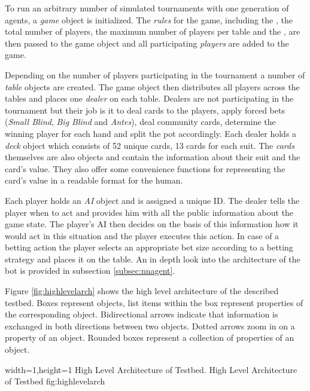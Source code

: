 To run an arbitrary number of simulated tournaments with one generation of agents, a \textit{game} object is initialized. The \textit{rules} for the game, including the , the total number of players, the maximum number of players per table and the , are then passed to the game object and all participating \textit{players} are added to the game. \par Depending on the number of players participating in the tournament a number of \textit{table} objects are created. The game object then distributes all players across the tables and places one \textit{dealer} on each table. Dealers are not participating in the tournament but their job is it to deal cards to the players, apply forced bets (\textit{Small Blind}, \textit{Big Blind} and \textit{Antes}), deal community cards, determine the winning player for each hand and split the pot accordingly. Each dealer holds a \textit{deck} object which consists of 52 unique cards, 13 cards for each suit. The \textit{cards} themselves are also objects and contain the information about their suit and the card's value. They also offer some convenience functions for representing the card's value in a readable format for the human. \par
Each player holds an \textit{AI} object and is assigned a unique ID. The dealer tells the player when to act and provides him with all the public information about the game state. The player's AI then decides on the basis of this information how it would act in this situation and the player executes this action. In case of a betting action the player selects an appropriate bet size according to a betting strategy and places it on the table. An in depth look into the architecture of the bot is provided in subsection \ref{subsec:nnagent}. \par
Figure \ref{fig:highlevelarch} shows the high level architecture of the described testbed. Boxes represent objects, list items within the box represent properties of the corresponding object. Bidirectional arrows indicate that information is exchanged in both directions between two objects. Dotted arrows zoom in on a property of an object. Rounded boxes represent a collection of properties of an object.
\par
{}%
  {width=1\textwidth,height=1\textheight}%
  {High Level Architecture of Testbed.}%
  {High Level Architecture of Testbed}%
  {fig:highlevelarch}%

